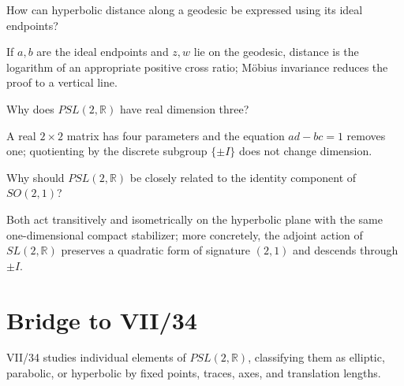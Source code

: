 \begin{problem}\label{prob:vii33-ch03}
How can hyperbolic distance along a geodesic be expressed using its ideal endpoints?
\end{problem}
\begin{solution}
If \(a,b\) are the ideal endpoints and \(z,w\) lie on the geodesic, distance is the logarithm of an appropriate positive cross ratio; Möbius invariance reduces the proof to a vertical line.
\end{solution}

\begin{problem}\label{prob:vii33-ch04}
Why does \(PSL(2,\mathbb R)\) have real dimension three?
\end{problem}
\begin{solution}
A real \(2\times2\) matrix has four parameters and the equation \(ad-bc=1\) removes one; quotienting by the discrete subgroup \(\{\pm I\}\) does not change dimension.
\end{solution}

\begin{problem}\label{prob:vii33-ch05}
Why should \(PSL(2,\mathbb R)\) be closely related to the identity component of \(SO(2,1)\)?
\end{problem}
\begin{solution}
Both act transitively and isometrically on the hyperbolic plane with the same one-dimensional compact stabilizer; more concretely, the adjoint action of \(SL(2,\mathbb R)\) preserves a quadratic form of signature \((2,1)\) and descends through \(\pm I\).
\end{solution}

\section*{Bridge to VII/34}
VII/34 studies individual elements of \(PSL(2,\mathbb R)\), classifying them as elliptic, parabolic, or hyperbolic by fixed points, traces, axes, and translation lengths.
